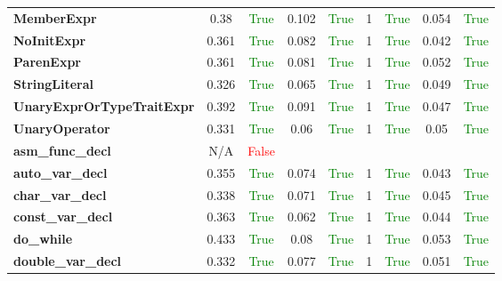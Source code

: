 \documentclass{article}
\begin{document}
\begin{xltabular}{\textwidth}{lcccccccc}
\textbf{{\fontsize{10}{12}\selectfont MemberExpr}}& 0.38&\textcolor{green}{True}& 0.102&\textcolor{green}{True}& 1&\textcolor{green}{True}& 0.054&\textcolor{green}{True} \\[0.5ex]
\textbf{{\fontsize{10}{12}\selectfont NoInitExpr}}& 0.361&\textcolor{green}{True}& 0.082&\textcolor{green}{True}& 1&\textcolor{green}{True}& 0.042&\textcolor{green}{True} \\[0.5ex]
\textbf{{\fontsize{10}{12}\selectfont ParenExpr}}& 0.361&\textcolor{green}{True}& 0.081&\textcolor{green}{True}& 1&\textcolor{green}{True}& 0.052&\textcolor{green}{True} \\[0.5ex]
\textbf{{\fontsize{10}{12}\selectfont StringLiteral}}& 0.326&\textcolor{green}{True}& 0.065&\textcolor{green}{True}& 1&\textcolor{green}{True}& 0.049&\textcolor{green}{True} \\[0.5ex]
\textbf{{\fontsize{10}{12}\selectfont UnaryExprOrTypeTraitExpr}}& 0.392&\textcolor{green}{True}& 0.091&\textcolor{green}{True}& 1&\textcolor{green}{True}& 0.047&\textcolor{green}{True} \\[0.5ex]
\textbf{{\fontsize{10}{12}\selectfont UnaryOperator}}& 0.331&\textcolor{green}{True}& 0.06&\textcolor{green}{True}& 1&\textcolor{green}{True}& 0.05&\textcolor{green}{True} \\[0.5ex]
\textbf{{\fontsize{10}{12}\selectfont asm\_func\_decl}}& N/A&\textcolor{red}{False} \\[0.5ex]
\textbf{{\fontsize{10}{12}\selectfont auto\_var\_decl}}& 0.355&\textcolor{green}{True}& 0.074&\textcolor{green}{True}& 1&\textcolor{green}{True}& 0.043&\textcolor{green}{True} \\[0.5ex]
\textbf{{\fontsize{10}{12}\selectfont char\_var\_decl}}& 0.338&\textcolor{green}{True}& 0.071&\textcolor{green}{True}& 1&\textcolor{green}{True}& 0.045&\textcolor{green}{True} \\[0.5ex]
\textbf{{\fontsize{10}{12}\selectfont const\_var\_decl}}& 0.363&\textcolor{green}{True}& 0.062&\textcolor{green}{True}& 1&\textcolor{green}{True}& 0.044&\textcolor{green}{True} \\[0.5ex]
\textbf{{\fontsize{10}{12}\selectfont do\_while}}& 0.433&\textcolor{green}{True}& 0.08&\textcolor{green}{True}& 1&\textcolor{green}{True}& 0.053&\textcolor{green}{True} \\[0.5ex]
\textbf{{\fontsize{10}{12}\selectfont double\_var\_decl}}& 0.332&\textcolor{green}{True}& 0.077&\textcolor{green}{True}& 1&\textcolor{green}{True}& 0.051&\textcolor{green}{True} \\[0.5ex]

\end{xltabular}
\end{document}
